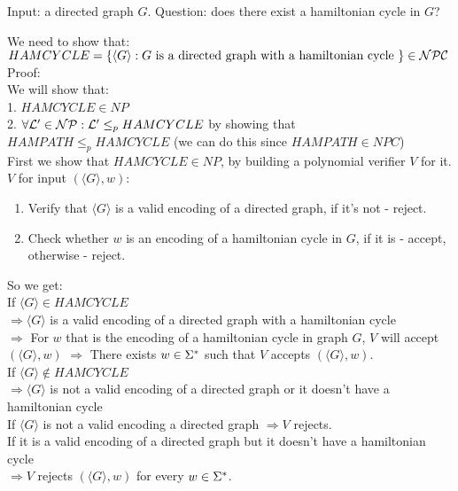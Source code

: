 Input: a directed graph $G$.
Question: does there exist a hamiltonian cycle in $G$?

We need to show that: \\
$HAMCYCLE = \{\langle G \rangle: G \text{ is a directed graph with a hamiltonian cycle }\} \in \mathcal{N}\mathcal{P}\mathcal{C}$ \\

Proof: \\
We will show that: \\
1. $HAMCYCLE \in NP$ \\
2. $\forall \mathcal{L}' \in \mathcal{N}\mathcal{P}: \mathcal{L}' \leq_p HAMCYCLE$ by showing that $HAMPATH \leq_p HAMCYCLE$ (we can do this since $HAMPATH \in NPC$) \\

First we show that $HAMCYCLE \in NP$, by building a polynomial verifier $V$ for it. \\
$V$ for input $(\langle G \rangle, w)$:
\begin{enumerate}[1., itemsep=5pt]
    \item Verify that $\langle G \rangle$ is a valid encoding of a directed graph, if it's not - reject.
    \item Check whether $w$ is an encoding of a hamiltonian cycle in $G$, if it is - accept, otherwise - reject.
\end{enumerate}

So we get: \\
If $\langle G \rangle \in HAMCYCLE$ \\
$\Rightarrow \langle G \rangle$ is a valid encoding of a directed graph with a hamiltonian cycle \\
$\Rightarrow $ For $w$ that is the encoding of a hamiltonian cycle in graph $G$, $V$ will accept $(\langle G \rangle, w)$
$\Rightarrow $ There exists $w \in \Sigma^*$ such that $V$ accepts $(\langle G \rangle, w)$. \\

If $\langle G \rangle \notin HAMCYCLE$ \\
$\Rightarrow \langle G \rangle$ is not a valid encoding of a directed graph or it doesn't have a hamiltonian cycle \\
If $\langle G \rangle$ is not a valid encoding a directed graph $\Rightarrow V$ rejects. \\
If it is a valid encoding of a directed graph but it doesn't have a hamiltonian cycle \\
$\Rightarrow V$ rejects $(\langle G \rangle, w)$ for every $w \in \Sigma^*$. \\

